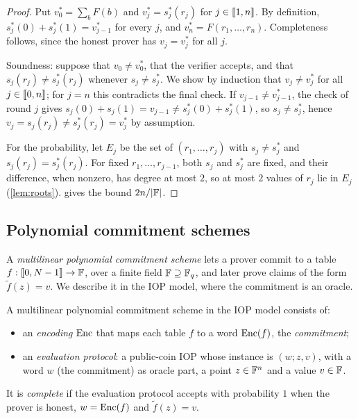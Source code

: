 \begin{proof}
Put $v^*_0 = \sum_b F(b)$ and $v^*_j = s^*_j(r_j)$ for $j \in \llbracket 1, n \rrbracket$.
By definition, $s^*_j(0) + s^*_j(1) = v^*_{j-1}$ for every $j$, and $v^*_n = F(r_1,\dots,r_n)$.
Completeness follows, since the honest prover has $v_j = v^*_j$ for all $j$.

Soundness: suppose that $v_0 \ne v^*_0$, that the verifier accepts, and that $s_j(r_j) \ne s^*_j(r_j)$ whenever $s_j \ne s^*_j$.
We show by induction that $v_j \ne v^*_j$ for all $j \in \llbracket 0, n \rrbracket$; for $j = n$ this contradicts the final check.
If $v_{j-1} \ne v^*_{j-1}$, the check of round $j$ gives $s_j(0) + s_j(1) = v_{j-1} \ne s^*_j(0) + s^*_j(1)$, so $s_j \ne s^*_j$, hence $v_j = s_j(r_j) \ne s^*_j(r_j) = v^*_j$ by assumption.

For the probability, let $E_j$ be the set of $(r_1,\dots,r_j)$ with $s_j \ne s^*_j$ and $s_j(r_j) = s^*_j(r_j)$.
For fixed $r_1,\dots,r_{j-1}$, both $s_j$ and $s^*_j$ are fixed, and their difference, when nonzero, has degree at most $2$, so at most $2$ values of $r_j$ lie in $E_j$ (\cref{lem:roots}).
 gives the bound $2n/|\mathbb{F}|$.
\end{proof}

\subsection{Polynomial commitment schemes}\label{sec:proofs:pcs}

A \emph{multilinear polynomial commitment scheme} lets a prover commit to a table $f : \llbracket 0, N-1 \rrbracket \to \mathbb{F}$, over a finite field $\mathbb{F} \supseteq \mathbb{F}_q$, and later prove claims of the form $\tilde f(z) = v$.
We describe it in the IOP model, where the commitment is an oracle.

\begin{definition}\label{def:pcs}
A multilinear polynomial commitment scheme in the IOP model consists of:
\begin{itemize}
  \item an \emph{encoding} $\mathrm{Enc}$ that maps each table $f$ to a word $\mathrm{Enc}(f)$, the \emph{commitment};
  \item an \emph{evaluation protocol}: a public-coin IOP whose instance is $(w; z, v)$, with a word $w$ (the commitment) as oracle part, a point $z \in \mathbb{F}^n$ and a value $v \in \mathbb{F}$.
\end{itemize}
It is \emph{complete} if the evaluation protocol accepts with probability $1$ when the prover is honest, $w = \mathrm{Enc}(f)$ and $\tilde f(z) = v$.
\end{definition}


